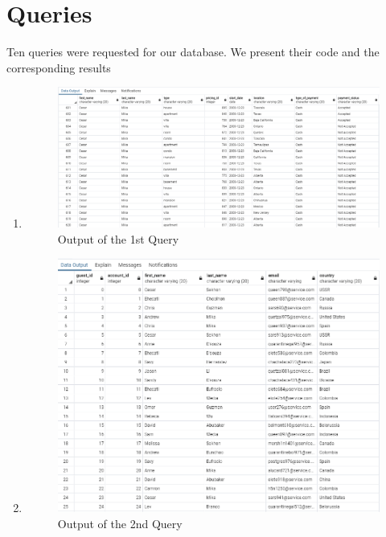 \documentclass[12pt, lettersize]{article}
\theoremstyle{Remark}
\begin{document}
	\newpage

	\section{Queries}
	Ten queries were requested for our database. We present their code and the corresponding results
	
	\begin{enumerate}
		
		\item 
		
		
		\begin{figure}[h]
			\centering
			\includegraphics[width= \linewidth]{Query1Output.png}
			\caption{Output of the 1st Query}
		\end{figure}
		
		\newpage
		
		\item 
		
		
		\begin{figure}[h]
		\centering
		\includegraphics[width= \linewidth]{Query2Output.png}
		\caption{Output of the 2nd Query}
		\end{figure}


\end{enumerate}
\end{document}
